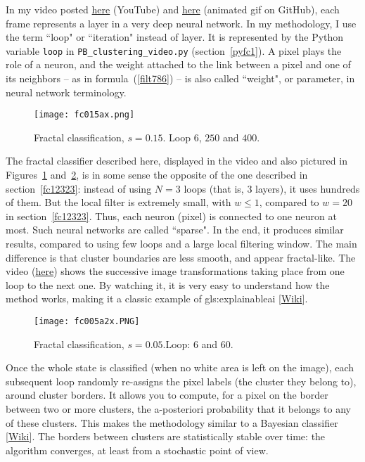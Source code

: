 \documentclass[oneside,10pt]{book}
\begin{document}
In my video posted \href{https://www.youtube.com/watch?v=dNPSEh-X6uw}{here} (YouTube) and \href{https://github.com/VincentGranville/Point-Processes/blob/main/Videos/fractal005.gif}{here} (animated gif on GitHub), each frame represents a layer in a \textcolor{index}{very deep neural network}. In my methodology, I use the term ``loop" or ``iteration" instead of layer. It is represented by the Python variable \texttt{loop} in \texttt{PB\_clustering\_video.py} (section~\ref{pyfc1}).
A pixel plays the role of a \textcolor{index}{neuron}, and the weight attached to the link between a pixel and one of its neighbors -- as in formula~(\ref{filt786}) --  is also called ``weight", or parameter, in neural network  terminology.


\begin{figure}[H]
\centering
\texttt{[image: fc015ax.png]}
\caption{Fractal classification, $s=0.15$. Loop $6$, $250$ and $400$.}
\label{fc015a}
\end{figure}

The fractal classifier described here, displayed in the video and also pictured in Figures~\ref{fc015a} and~\ref{fc005a}, is in some sense the opposite of the one described in section~\ref{fc12323}: instead of using $N=3$ loops (that is, 3 layers), it uses hundreds of them. But the local filter is extremely small, with $w\leq1$, compared to $w=20$ in section~\ref{fc12323}. Thus, each neuron (pixel) is connected to one neuron at most. Such neural networks are called ``sparse". In the end, it produces similar results, compared to using few loops and a large local filtering window. The main difference is that cluster boundaries are less smooth, and appear fractal-like. The video (\href{https://github.com/VincentGranville/Point-Processes/blob/main/Videos/fractal005.gif}{here}) shows the successive image transformations taking place from one loop to the next one. By watching it, it is very easy to understand how the method works, making it a classic example of
\gls{gls:explainableai} [\href{https://en.wikipedia.org/wiki/Explainable_artificial_intelligence}{Wiki}].

\begin{figure}[H]
\centering
\texttt{[image: fc005a2x.PNG]}
\caption{Fractal classification, $s=0.05$.Loop: $6$ and $60$.}
\label{fc005a}
\end{figure}

Once the whole state is classified  (when no white area is left on the image), each subsequent loop randomly re-assigns the pixel labels (the cluster they belong to), around cluster borders. It allows you to compute, for a pixel on the border between two or more clusters, the a-posteriori probability that it belongs to any of these clusters. This makes the methodology similar to a \textcolor{index}{Bayesian classifier} [\href{https://en.wikipedia.org/wiki/Bayes_classifier}{Wiki}]. The borders between clusters are statistically stable over time: the algorithm converges, at least from a stochastic point of view.
\end{document}
